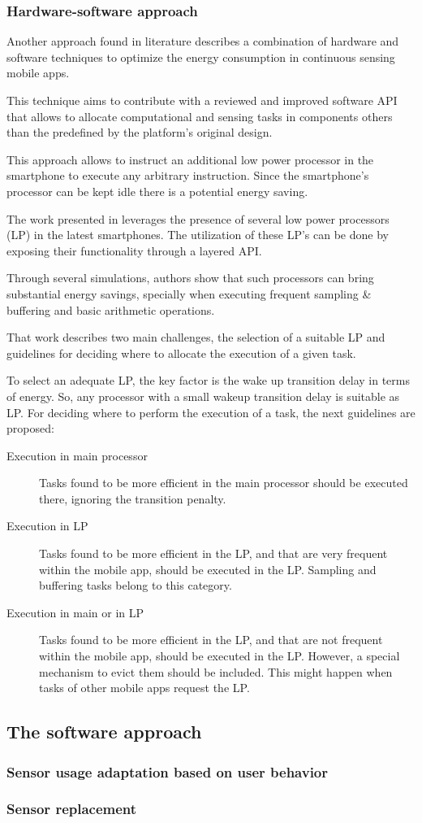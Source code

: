 \subsubsection{Hardware-software approach}

Another approach found in literature describes a combination of hardware and software techniques to optimize the energy consumption in continuous sensing mobile apps.

This technique aims to contribute with a reviewed and improved software API that allows to allocate computational and sensing tasks in components others than the predefined by the platform's original design.

This approach allows to instruct an additional low power processor in the smartphone to execute any arbitrary instruction.
Since the smartphone's processor can be kept idle there is a potential energy saving.

The work presented in \cite{Ra2012} leverages the presence of several low power processors (LP) in the latest smartphones.
The utilization of these LP's can be done by exposing their functionality through a layered API.

Through several simulations, authors show that such processors can bring substantial energy savings, specially when executing frequent sampling \& buffering and basic arithmetic operations.

That work describes two main challenges, the selection of a suitable LP and guidelines for deciding where to allocate the execution of a given task.

To select an adequate LP, the key factor is the wake up transition delay in terms of energy. So, any processor with a small wakeup transition delay is suitable as LP.
For deciding where to perform the execution of a task, the next guidelines are proposed:
\begin{description}
  \item[Execution in main processor]{Tasks found to be more efficient in the main processor should be executed there, ignoring the transition penalty}.
  \item[Execution in LP]{Tasks found to be more efficient in the LP, and that are very frequent within the mobile app, should be executed in the LP. Sampling and buffering tasks belong to this category}.
  \item[Execution in main or in LP]{Tasks found to be more efficient in the LP, and  that are not frequent within the mobile app, should be executed in the LP. However, a special mechanism to evict them should be included. This might happen when tasks of other mobile apps request the LP}.
\end{description}


\subsection{The software approach} 
\label{sub:the_software_approach}

\subsubsection{Sensor usage adaptation based on user behavior
}
\label{ssub:sensor_usage_adaptation_based_on_user_behavior_}


\subsubsection{Sensor replacement} 
\label{ssub:sensor_replacement}